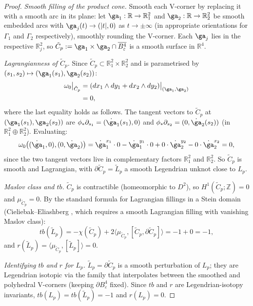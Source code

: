 \documentclass[12pt]{article}
\theoremstyle{definition}
\newcommand{\R}{\mathbb{R}}
\newcommand{\Z}{\mathbb{Z}}
\newcommand{\om}{\omega}
\newcommand{\eps}{\varepsilon}
\begin{document}
\begin{proof}
\emph{Smooth filling of the product cone.}
Smooth each V-corner by replacing it with a smooth arc in its plane:
let $\ga_1:\R\to\R^2_1$ and $\ga_2:\R\to\R^2_2$ be smooth embedded
arcs with $\ga_j(t)\to(|t|,0)$ as $t\to\pm\infty$ (in appropriate
orientations for $\Gamma_1$ and $\Gamma_2$ respectively), smoothly
rounding the V-corner.  Each $\ga_j$ lies in the respective $\R^2_j$,
so $\tilde{C}_p:=\ga_1\times\ga_2\cap\overline{B^4_\eps}$ is a smooth
surface in $\R^4$.

\emph{Lagrangianness of $\tilde{C}_p$.}
Since $\tilde{C}_p\subset\R^2_1\times\R^2_2$ and is parametrised by
$(s_1,s_2)\mapsto(\ga_1(s_1),\ga_2(s_2))$:
\begin{align*}
  \om_0\bigl|_{\tilde{C}_p}
  &= (dx_1\wedge dy_1+dx_2\wedge dy_2)\bigl|_{(\ga_1,\ga_2)}\\
  &= 0,
\end{align*}
where the last equality holds as follows.  The tangent vectors to
$\tilde{C}_p$ at $(\ga_1(s_1),\ga_2(s_2))$ are $\phi_*\partial_{s_1}=
(\dot\ga_1(s_1),0)$ and $\phi_*\partial_{s_2}=(0,\dot\ga_2(s_2))$ (in
$\R^2_1\oplus\R^2_2$).  Evaluating:
\[
  \om_0\bigl((\dot\ga_1,0),(0,\dot\ga_2)\bigr)
  = \dot\ga_1^{x_1}\cdot 0 - \dot\ga_1^{y_1}\cdot 0
  + 0\cdot\dot\ga_2^{y_2} - 0\cdot\dot\ga_2^{x_2}
  = 0,
\]
since the two tangent vectors live in complementary factors
$\R^2_1$ and $\R^2_2$.  So $\tilde{C}_p$ is smooth and Lagrangian,
with $\partial\tilde{C}_p=\tilde{L}_p$ a smooth Legendrian unknot close
to $L_p$.

\emph{Maslov class and $tb$.}
$\tilde{C}_p$ is contractible (homeomorphic to $D^2$), so
$H^1(\tilde{C}_p;\Z)=0$ and $\mu_{\tilde{C}_p}=0$.  By the standard
formula for Lagrangian fillings in a Stein domain
(Cieliebak--Eliashberg \cite[Lemma~16.6]{CE12}, which requires a smooth
Lagrangian filling with vanishing Maslov class):
\begin{equation}\label{eq:tb_formula}
  tb(\tilde{L}_p)
  = -\chi(\tilde{C}_p) + 2\langle\mu_{\tilde{C}_p},
      [\tilde{C}_p,\partial\tilde{C}_p]\rangle
  = -1 + 0 = -1,
\end{equation}
and $r(\tilde{L}_p)=\langle\mu_{\tilde{C}_p},[\tilde{L}_p]\rangle=0$.

\emph{Identifying $tb$ and $r$ for $L_p$.}
$\tilde{L}_p=\partial\tilde{C}_p$ is a smooth perturbation of $L_p$;
they are Legendrian isotopic via the family that interpolates between
the smoothed and polyhedral V-corners (keeping $\partial B^4_\eps$ fixed).
Since $tb$ and $r$ are Legendrian-isotopy invariants, $tb(L_p)=tb(\tilde{L}_p)=-1$
and $r(L_p)=0$.


\end{proof}
\end{document}
